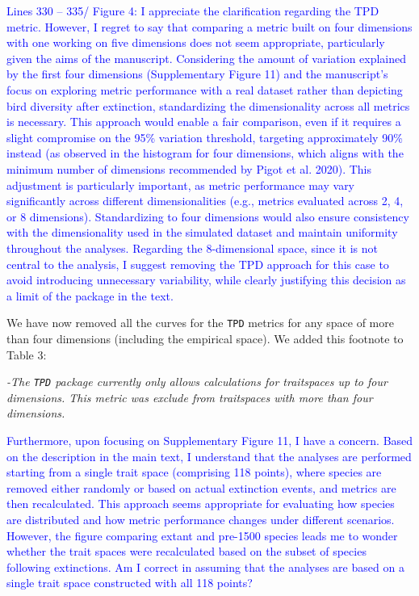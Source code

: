 \documentclass[
]{article}
\begin{document}
\textcolor{blue}{Lines 330 – 335/ Figure 4: I appreciate the clarification regarding the TPD metric.
However, I regret to say that comparing a metric built on four dimensions with one working on five dimensions does not seem appropriate, particularly given the aims of the manuscript.
Considering the amount of variation explained by the first four dimensions (Supplementary Figure 11) and the manuscript's focus on exploring metric performance with a real dataset rather than depicting bird diversity after extinction, standardizing the dimensionality across all metrics is necessary.
This approach would enable a fair comparison, even if it requires a slight compromise on the 95\% variation threshold, targeting approximately 90\% instead (as observed in the histogram for four dimensions, which aligns with the minimum number of dimensions recommended by Pigot et al. 2020).
This adjustment is particularly important, as metric performance may vary significantly across different dimensionalities (e.g., metrics evaluated across 2, 4, or 8 dimensions).
Standardizing to four dimensions would also ensure consistency with the dimensionality used in the simulated dataset and maintain uniformity throughout the analyses.
Regarding the 8-dimensional space, since it is not central to the analysis, I suggest removing the TPD approach for this case to avoid introducing unnecessary variability, while clearly justifying this decision as a limit of the package in the text.}

We have now removed all the curves for the \texttt{TPD} metrics for any space of more than four dimensions (including the empirical space).
We added this footnote to Table 3:

\textit{-The \texttt{TPD} package currently only allows calculations for traitspaces up to four dimensions. This metric was exclude from traitspaces with more than four dimensions.}

\textcolor{blue}{Furthermore, upon focusing on Supplementary Figure 11, I have a concern.
Based on the description in the main text, I understand that the analyses are performed starting from a single trait space (comprising 118 points), where species are removed either randomly or based on actual extinction events, and metrics are then recalculated.
This approach seems appropriate for evaluating how species are distributed and how metric performance changes under different scenarios.
However, the figure comparing extant and pre-1500 species leads me to wonder whether the trait spaces were recalculated based on the subset of species following extinctions.
Am I correct in assuming that the analyses are based on a single trait space constructed with all 118 points?}
\end{document}
